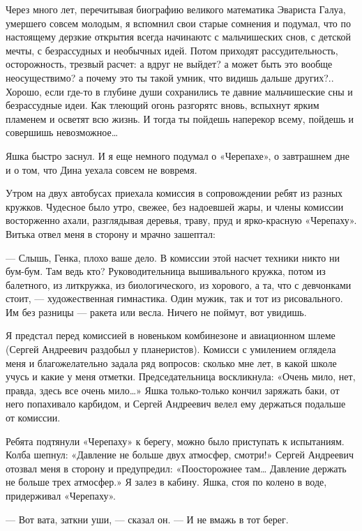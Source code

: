 Через много лет, перечитывая биографию великого математика Эвариста Галуа,
умершего совсем молодым, я вспомнил свои старые сомнения и подумал, что по
настоящему дерзкие  открытия  всегда  начинаютс  с  мальчишеских  снов,  с
детской  мечты,   с  безрассудных   и  необычных   идей.  Потом   приходят
рассудительность, осторожность, трезвый расчет: а вдруг не выйдет? а может
быть это вообще  неосуществимо? а почему  это ты такой  умник, что  видишь
дальше других?.. Хорошо, если где-то в глубине души сохранились те  давние
мальчишеские сны и безрассудные идеи.  Как тлеющий огонь разгорятс  вновь,
вспыхнут ярким пламенем и осветят всю жизнь. И тогда ты пойдешь  наперекор
всему, пойдешь и совершишь невозможное…

Яшка быстро заснул. И я еще немного подумал о «Черепахе», о завтрашнем дне
и о том, что Дина уехала совсем не вовремя.

Утром на двух автобусах приехала комиссия в сопровождении ребят из  разных
кружков. Чудесное было утро, свежее, без надоевшей жары, и члены  комиссии
восторженно  ахали,  разглядывая  деревья,  траву,  пруд  и   ярко-красную
«Черепаху». Витька отвел меня в сторону и мрачно зашептал:

— Слышь, Генка, плохо ваше дело.  В комиссии этой насчет техники никто  ни
бум-бум. Там  ведь кто?  Руководительница  вышивального кружка,  потом  из
балетного, из  литкружка, из  биологического,  из хорового,  а та,  что  с
девчонками стоит, — художественная  гимнастика. Один мужик,  так и тот  из
рисовального. Им без  разницы — ракета  или весла. Ничего  не поймут,  вот
увидишь.

Я предстал перед  комиссией в  новеньком комбинезоне  и авиационном  шлеме
(Сергей Андреевич раздобыл  у планеристов). Комисси  с умилением  оглядела
меня и благожелательно задала ряд вопросов: сколько мне лет, в какой школе
учусь и какие у меня  отметки. Председательница воскликнула: «Очень  мило,
нет, правда, здесь  все очень  мило…» Яшка  только-только кончил  заряжать
баки, от него попахивало карбидом, и Сергей Андреевич велел ему  держаться
подальше от комиссии.

Ребята подтянули «Черепаху» к берегу, можно было приступать к  испытаниям.
Колба шепнул: «Давление не больше двух атмосфер, смотри!» Сергей Андреевич
отозвал меня в сторону и предупредил: «Поосторожнее там… Давление  держать
не больше трех атмосфер.» Я залез в  кабину. Яшка, стоя по колено в  воде,
придерживал «Черепаху».

— Вот вата, заткни уши, — сказал он. — И не вмажь в тот берег.

